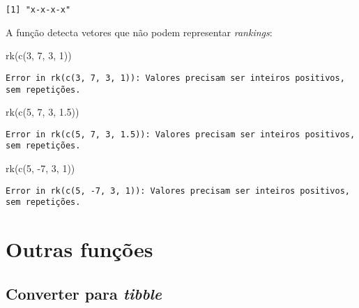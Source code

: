 \documentclass[
  letterpaper,
  DIV=11,
  numbers=noendperiod]{scrreprt}
\newenvironment{Shaded}{\begin{snugshade}}{\end{snugshade}}
\newcommand{\DecValTok}[1]{\textcolor[rgb]{0.68,0.00,0.00}{#1}}
\newcommand{\FloatTok}[1]{\textcolor[rgb]{0.68,0.00,0.00}{#1}}
\newcommand{\FunctionTok}[1]{\textcolor[rgb]{0.28,0.35,0.67}{#1}}
\newcommand{\NormalTok}[1]{\textcolor[rgb]{0.00,0.23,0.31}{#1}}
\newcommand{\SpecialCharTok}[1]{\textcolor[rgb]{0.37,0.37,0.37}{#1}}
\begin{document}
\begin{verbatim}
[1] "x-x-x-x"
\end{verbatim}

A função detecta vetores que não podem representar \emph{rankings}:

\begin{Shaded}
\begin{Highlighting}[]
\FunctionTok{rk}\NormalTok{(}\FunctionTok{c}\NormalTok{(}\DecValTok{3}\NormalTok{, }\DecValTok{7}\NormalTok{, }\DecValTok{3}\NormalTok{, }\DecValTok{1}\NormalTok{))}
\end{Highlighting}
\end{Shaded}

\begin{verbatim}
Error in rk(c(3, 7, 3, 1)): Valores precisam ser inteiros positivos, sem repetições.
\end{verbatim}

\begin{Shaded}
\begin{Highlighting}[]
\FunctionTok{rk}\NormalTok{(}\FunctionTok{c}\NormalTok{(}\DecValTok{5}\NormalTok{, }\DecValTok{7}\NormalTok{, }\DecValTok{3}\NormalTok{, }\FloatTok{1.5}\NormalTok{))}
\end{Highlighting}
\end{Shaded}

\begin{verbatim}
Error in rk(c(5, 7, 3, 1.5)): Valores precisam ser inteiros positivos, sem repetições.
\end{verbatim}

\begin{Shaded}
\begin{Highlighting}[]
\FunctionTok{rk}\NormalTok{(}\FunctionTok{c}\NormalTok{(}\DecValTok{5}\NormalTok{, }\SpecialCharTok{{-}}\DecValTok{7}\NormalTok{, }\DecValTok{3}\NormalTok{, }\DecValTok{1}\NormalTok{))}
\end{Highlighting}
\end{Shaded}

\begin{verbatim}
Error in rk(c(5, -7, 3, 1)): Valores precisam ser inteiros positivos, sem repetições.
\end{verbatim}

\section{Outras funções}\label{outras-funuxe7uxf5es}

\subsection{\texorpdfstring{Converter para
\emph{tibble}}{Converter para tibble}}\label{converter-para-tibble}
\end{document}
